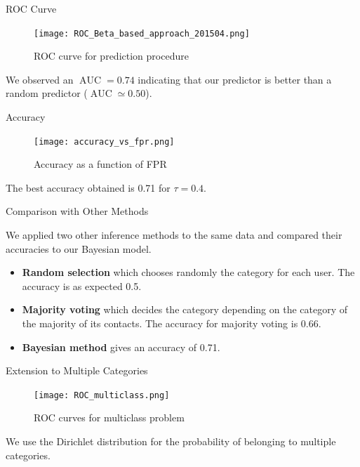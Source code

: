 \documentclass{beamer}
\newcommand{\AUC}{\operatorname{AUC}}
\begin{document}
\begin{frame}{ROC Curve}

\begin{figure}
\begin{center}
\texttt{[image: ROC\_Beta\_based\_approach\_201504.png]}
\caption{ROC curve for prediction procedure}
\label{ROC_multiclass}
\end{center}
\end{figure}

We observed an $\AUC = 0.74$ indicating that our predictor is better than a random predictor ($\AUC \simeq 0.50$).

\end{frame}


\begin{frame}{Accuracy}

\begin{figure}[p]
\begin{center}
\texttt{[image: accuracy\_vs\_fpr.png]}
\caption{Accuracy as a function of FPR}
\label{fig:accuracy_vs_fpr}
\end{center}
\end{figure}

The best accuracy obtained is \num{0.71} for $\tau = 0.4$.

\end{frame}

\begin{frame}{Comparison with Other Methods}

We applied two other inference methods to the same data and compared their accuracies to our Bayesian model.

\begin{itemize}
	\item \textbf{Random selection} which chooses randomly the category for each user.
	The accuracy is as expected \num{0.5}.
	\item \textbf{Majority voting} which decides the category depending on the category of the majority of its contacts.
	The accuracy for majority voting is \num{0.66}.
	\item \textbf{Bayesian method} gives an accuracy of \num{0.71}.
\end{itemize}

\end{frame}


\begin{frame}{Extension to Multiple Categories}

\begin{figure}[h]
\begin{center}
\texttt{[image: ROC\_multiclass.png]}
\caption{ROC curves for multiclass problem}
\end{center}
\label{roc_multiple_categories}
\end{figure}

We use the Dirichlet distribution for the probability of belonging to multiple categories.

\end{frame}
\end{document}

